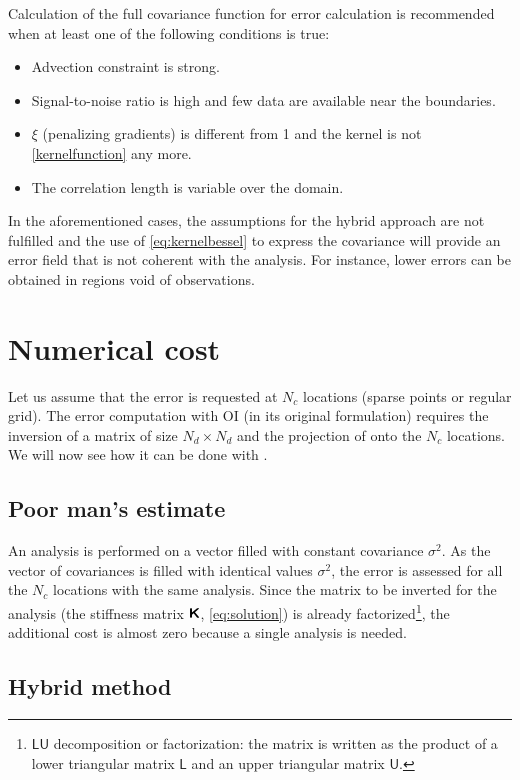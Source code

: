 Calculation of the full covariance function for error calculation is recommended when at least one of the following conditions is true:
\begin{itemize}
\item Advection constraint is strong.
\item Signal-to-noise ratio is high and few data are available near the boundaries.
\item $\xi$ (penalizing gradients) is different from 1 and the kernel is not \eqref{kernelfunction} any more. 
\item The correlation length is variable over the domain. 
\end{itemize}

In the aforementioned cases, the assumptions for the hybrid approach are not fulfilled and the use of \eqref{eq:kernelbessel} to express the covariance will provide an error field that is not coherent with the analysis. For instance, lower errors can be obtained in regions void of observations. 

\section{Numerical cost}

Let us assume that the error is requested at $N_{c}$ locations (sparse points or regular grid). The error computation with OI (in its original formulation) requires the inversion of a matrix of size $N_{d} \times N_{d}$ and the projection of onto the $N_{c}$ locations. We will now see how it can be done with \diva.

\subsection{Poor man's estimate}

An analysis is performed on a vector filled with constant covariance $\sigma^{2}$. As the vector of covariances is filled with identical values $\sigma^{2}$, the error is assessed for all the $N_{c}$ locations with the same analysis. Since the matrix to be inverted for the analysis (the stiffness matrix $\mbox{\boldmath $ \protect\mathsf{K} $}$, \eqref{eq:solution}) is already factorized\footnote{$\mathsf{LU}$ decomposition or factorization: the matrix is written as the product of a lower triangular matrix $\mathsf{L}$ and an upper triangular matrix $\mathsf{U}$.}, the additional cost is almost zero because a single analysis is needed.   

\subsection{Hybrid method} 

